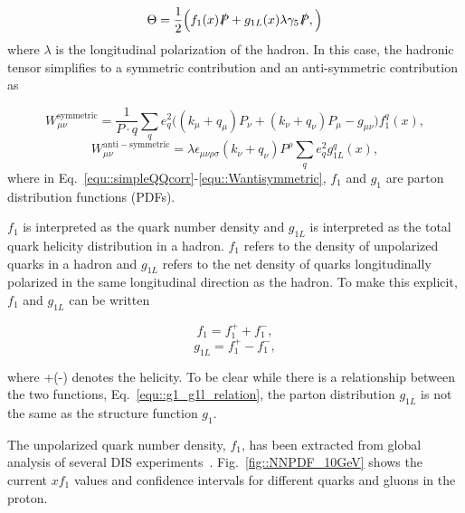 \begin{equation}
  \label{equ::simpleQQcorr}
  \Theta = \frac{1}{2}
  \Big(
  f_1(x)\slashed{P} +
  g_{1L}(x)\lambda\gamma_5\slashed{P},
  \Big)
\end{equation}
\noindent
where $\lambda$ is the longitudinal polarization of the hadron.  In this case,
the hadronic tensor simplifies to a symmetric contribution and an anti-symmetric
contribution as~\cite{Barone:2001sp}

\begin{equation}
  \label{equ::simpleHadronTensor}
  W^{\mathrm{symmetric}}_{\mu\nu} = \frac{1}{P\cdot q} \sum_q e_q^2
  \Big( (k_{\mu}+q_{\mu})P_{\nu} + (k_{\nu}+q_{\nu})P_{\mu}-g_{\mu\nu}
  \Big) f_1^q(x),
\end{equation}
\begin{equation}
  W^{\mathrm{anti-symmetric}}_{\mu\nu} =
  \lambda\epsilon_{\mu\nu\rho\sigma}(k_{\nu}+q_{\nu})P^{\rho}\sum_q e^2_q
  g^q_{1L}(x),
  \label{equ::Wantisymmetric}
\end{equation}
\noindent
where in Eq.~\ref{equ::simpleQQcorr}-\ref{equ::Wantisymmetric}, $f_1$ and $g_1$
are parton distribution functions (PDFs).

$f_1$ is interpreted as the quark number density and $g_{1L}$ is interpreted as
the total quark helicity distribution in a hadron.  $f_1$ refers to the density
of unpolarized quarks in a hadron and $g_{1L}$ refers to the net density of
quarks longitudinally polarized in the same longitudinal direction as the
hadron.  To make this explicit, $f_1$ and $g_{1L}$ can be written

\begin{multicols}{2}
  \noindent
  \begin{equation}
    f_1 = f_1^{+} + f_1^{-},
  \end{equation}
  \begin{equation}
    g_{1L} = f_1^{+} - f_1^{-},
  \end{equation}
\end{multicols}
\noindent
where +(-) denotes the helicity.  To be clear while there is a relationship
between the two functions, Eq.~\ref{equ::g1_g1l_relation}, the parton
distribution $g_{1L}$ is not the same as the structure function $g_1$.

The unpolarized quark number density, $f_1$, has been extracted from global
analysis of several DIS experiments~\cite{Rojo_2015}.
Fig.~\ref{fig::NNPDF_10GeV} shows the current $xf_1$ values and confidence
intervals for different quarks and gluons in the proton.


